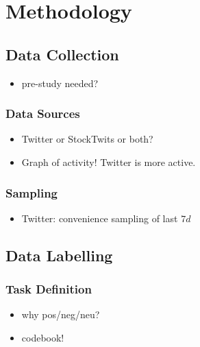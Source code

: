 \section{Methodology}
\subsection{Data Collection}
\begin{itemize}[noitemsep]
	\item pre-study needed?
\end{itemize}

\subsubsection{Data Sources}
\begin{itemize}[noitemsep]
	\item Twitter or StockTwits or both?
	\item Graph of activity! Twitter is more active.
\end{itemize}





\subsubsection{Sampling}
\begin{itemize}[noitemsep]
	\item Twitter: convenience sampling of last $7d$
\end{itemize}


\subsection{Data Labelling}

\subsubsection{Task Definition}
\begin{itemize}[noitemsep]
	\item why pos/neg/neu?
	\item codebook!
\end{itemize}




